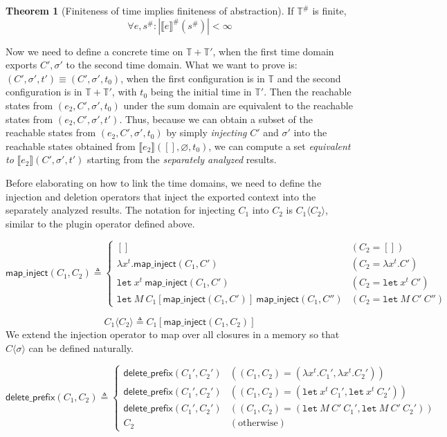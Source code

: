 \documentclass{article}
\theoremstyle{definition}
\newtheorem{thm}{Theorem}[section]
\newcommand*{\A}[1]{{#1}^{\#}}
\newcommand*{\Time}{\mathbb{T}}
\newcommand*{\ATime}{\A{\Time}}
\newcommand*{\sembracket}[1]{\lBrack{#1}\rBrack}
\newcommand*{\mapinject}{\mathsf{map\_inject}}
\newcommand*{\inject}[2]{{#1}\langle{#2}\rangle}
\newcommand*{\deletepre}{\mathsf{delete\_prefix}}
\newcommand*{\Let}{\mathtt{let}}
\begin{document}
\begin{thm}[Finiteness of time implies finiteness of abstraction]
  If $\ATime$ is finite,
  \[
    \forall e,\A{s}: |\A{\sembracket{e}}(\A{s})|<\infty
  \]
\end{thm}

Now we need to define a concrete time on $\Time+\Time'$, when the first time domain exports $C',\sigma'$ to the second time domain.
What we want to prove is: $(C',\sigma',t')\equiv(C',\sigma',t_{0})$, when the first configuration is in $\Time$ and the second configuration is in $\Time+\Time'$, with $t_{0}$ being the initial time in $\Time'$.
Then the reachable states from $(e_{2},C',\sigma',t_{0})$ under the sum domain are equivalent to the reachable states from $(e_{2},C',\sigma',t')$.
Thus, because we can obtain a subset of the reachable states from $(e_{2},C',\sigma',t_{0})$ by simply \emph{injecting} $C'$ and $\sigma'$ into the reachable states obtained from $\sembracket{e_{2}}([],\varnothing,t_{0})$, we can compute a set \textit{equivalent to} $\sembracket{e_{2}}(C',\sigma',t')$ starting from the \emph{separately analyzed} results.

Before elaborating on how to link the time domains, we need to define the injection and deletion operators that inject the exported context into the separately analyzed results.
The notation for injecting $C_{1}$ into $C_{2}$ is $\inject{C_{1}}{C_{2}}$, similar to the plugin operator defined above.

\[
  \mapinject(C_{1},C_{2})\triangleq
  \begin{cases}
    []                                                          & (C_{2}=[])                \\
    \lambda x^{t}. \mapinject(C_{1},C')                         & (C_{2}=\lambda x^{t}. C') \\
    \Let\:x^{t}\:\mapinject(C_{1},C')                           & (C_{2}=\Let\:x^{t}\:C')   \\
    \Let\:M\:C_{1}[\mapinject(C_{1},C')]\:\mapinject(C_{1},C'') & (C_{2}=\Let\:M\:C'\:C'')
  \end{cases}
\]

\[
  \inject{C_{1}}{C_{2}}\triangleq C_{1}[\mapinject(C_{1},C_{2})]
\]
We extend the injection operator to map over all closures in a memory so that $\inject{C}{\sigma}$ can be defined naturally.

\[
  \deletepre(C_{1},C_{2})\triangleq
  \begin{cases}
    \deletepre(C_{1}',C_{2}') & ((C_{1},C_{2})=(\lambda x^{t}.C_{1}',\lambda x^{t}.C_{2}')) \\
    \deletepre(C_{1}',C_{2}') & ((C_{1},C_{2})=(\Let\: x^{t}\:C_{1}',\Let\:x^{t}\:C_{2}'))  \\
    \deletepre(C_{1}',C_{2}') & ((C_{1},C_{2})=(\Let\:M\:C'\:C_{1}',\Let\:M\:C'\:C_{2}'))   \\
    C_{2}                     & (\text{otherwise})
  \end{cases}
\]
\end{document}

